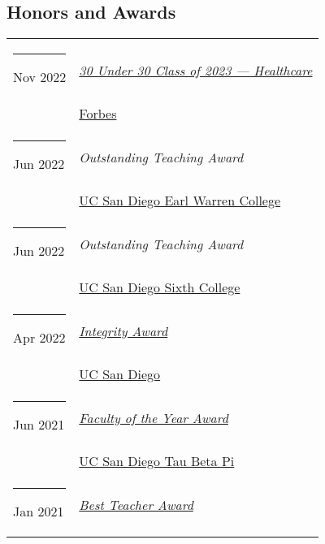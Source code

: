 \documentclass[margin,line]{res}
\begin{document}
\begin{resume}
\section{\sc Honors and Awards}
\begin{longtable}{@{}p{0.7in}p{4in}}
\hspace*{-4mm} \rule{-1mm}{5mm} Nov 2022 & \href{https://www.forbes.com/profile/niema-moshiri}{\textit{30 Under 30 Class of 2023 --- Healthcare}}\\*
\hspace*{-4mm} \hspace*{-4mm} & \hspace{4mm} \href{https://www.forbes.com/30-under-30/2023/healthcare/}{Forbes}\\
\hspace*{-4mm} \rule{-1mm}{5mm} Jun 2022 & \textit{Outstanding Teaching Award}\\*
\hspace*{-4mm} \hspace*{-4mm} & \hspace{4mm} \href{https://warren.ucsd.edu/}{UC San Diego Earl Warren College}\\
\hspace*{-4mm} \rule{-1mm}{5mm} Jun 2022 & \textit{Outstanding Teaching Award}\\*
\hspace*{-4mm} \hspace*{-4mm} & \hspace{4mm} \href{https://sixth.ucsd.edu/}{UC San Diego Sixth College}\\
\hspace*{-4mm} \rule{-1mm}{5mm} Apr 2022 & \href{https://academicintegrity.ucsd.edu/events/integrity-awards/index.html}{\textit{Integrity Award}}\\*
\hspace*{-4mm} \hspace*{-4mm} & \hspace{4mm} \href{https://www.ucsd.edu/}{UC San Diego}\\
\hspace*{-4mm} \rule{-1mm}{5mm} Jun 2021 & \href{https://tbp.ucsd.edu/home}{\textit{Faculty of the Year Award}}\\*
\hspace*{-4mm} \hspace*{-4mm} & \hspace{4mm} \href{https://tbp.ucsd.edu/home}{UC San Diego Tau Beta Pi}\\
\hspace*{-4mm} \rule{-1mm}{5mm} Jan 2021 & \href{https://jacobsschool.ucsd.edu/faculty/best-teacher-awards}{\textit{Best Teacher Award}}\\*

\end{longtable}
\end{resume}
\end{document}
